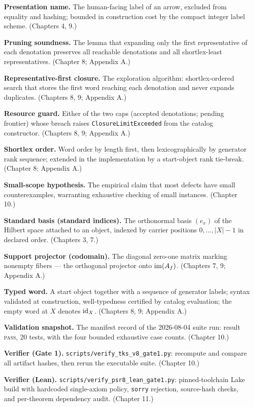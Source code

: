\textbf{Presentation name.} The human-facing label of an arrow,
excluded from equality and hashing; bounded in construction cost by
the compact integer label scheme. (Chapters 4, 9.)

\textbf{Pruning soundness.} The lemma that expanding only the first
representative of each denotation preserves all reachable denotations
and all shortlex-least representatives. (Chapter 8; Appendix A.)

\textbf{Representative-first closure.} The exploration algorithm:
shortlex-ordered search that stores the first word reaching each
denotation and never expands duplicates. (Chapters 8, 9; Appendix A.)

\textbf{Resource guard.} Either of the two caps (accepted denotations;
pending frontier) whose breach raises \texttt{ClosureLimitExceeded}
from the catalog constructor. (Chapters 8, 9; Appendix A.)

\textbf{Shortlex order.} Word order by length first, then
lexicographically by generator rank sequence; extended in the
implementation by a start-object rank tie-break. (Chapter 8;
Appendix A.)

\textbf{Small-scope hypothesis.} The empirical claim that most defects
have small counterexamples, warranting exhaustive checking of small
instances. (Chapter 10.)

\textbf{Standard basis (standard indices).} The orthonormal basis
$(e_x)$ of the Hilbert space attached to an object, indexed by carrier
positions $0, \dots, |X|-1$ in declared order. (Chapters 3, 7.)

\textbf{Support projector (codomain).} The diagonal zero-one matrix
marking nonempty fibers --- the orthogonal projector onto
$\mathrm{im}(A_f)$. (Chapters 7, 9; Appendix A.)

\textbf{Typed word.} A start object together with a sequence of
generator labels; syntax validated at construction, well-typedness
certified by catalog evaluation; the empty word at $X$ denotes
$\mathrm{id}_X$. (Chapters 8, 9; Appendix A.)

\textbf{Validation snapshot.} The manifest record of the 2026-08-04
suite run: result \textsc{pass}, 20 tests, with the four bounded
exhaustive case counts. (Chapter 10.)

\textbf{Verifier (Gate 1).} \texttt{scripts/verify\_tks\_v8\_gate1.py}:
recompute and compare all artifact hashes, then rerun the executable
suite. (Chapter 10.)

\textbf{Verifier (Lean).} \texttt{scripts/verify\_psr8\_lean\_gate1.py}:
pinned-toolchain Lake build with hardcoded single-axiom policy,
\texttt{sorry} rejection, source-hash checks, and per-theorem
dependency audit. (Chapter 11.)

